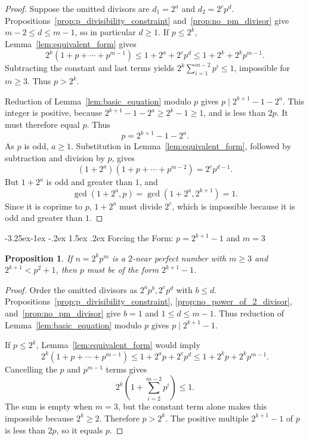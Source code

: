 \documentclass[10pt]{article}
\makeatletter
\renewcommand\subsection{\@startsection{subsection}{2}{\z@}
{-3.25ex\@plus -1ex \@minus -.2ex}
{1.5ex \@plus .2ex}
{\normalfont\normalsize\bfseries\boldmath}}
\newtheorem{proposition}{Proposition}
\theoremstyle{definition}
\makeatother
\begin{document}
\begin{proof}
Suppose the omitted divisors are $d_1=2^a$ and $d_2=2^cp^d$.
Propositions~\ref{prop:p_divisibility_constraint} and~\ref{prop:no_pm_divisor}
give $m-2\le d\le m-1$, so in particular $d\ge1$.
If $p\le2^k$, Lemma~\ref{lem:equivalent_form} gives
\[
2^k(1+p+\cdots+p^{m-1})
\le1+2^a+2^cp^d\le1+2^k+2^kp^{m-1}.
\]
Subtracting the constant and last terms yields
$2^k\sum_{i=1}^{m-2}p^i\le1$, impossible for $m\ge3$.
Thus $p>2^k$.

Reduction of Lemma~\ref{lem:basic_equation} modulo $p$ gives
$p\mid2^{k+1}-1-2^a$. This integer is positive, because
$2^{k+1}-1-2^a\ge2^k-1\ge1$, and is less than $2p$.
It must therefore equal $p$. Thus
\[
p=2^{k+1}-1-2^a.
\]
As $p$ is odd, $a\ge1$. Substitution in
Lemma~\ref{lem:equivalent_form}, followed by subtraction and division
by $p$, gives
\[
(1+2^a)(1+p+\cdots+p^{m-2})=2^cp^{d-1}.
\]
But $1+2^a$ is odd and greater than $1$, and
\[
\gcd(1+2^a,p)=\gcd(1+2^a,2^{k+1})=1.
\]
Since it is coprime to $p$, $1+2^a$ must divide $2^c$, which is
impossible because it is odd and greater than $1$.
\end{proof}

\subsection{Forcing the Form: $p = 2^{k+1} - 1$ and $m = 3$}
\label{sec:force-p-and-m}

\begin{proposition}\label{prop:p_is_mersenne_form}
    If $n=2^kp^m$ is a $2$-near perfect number with $m \ge 3$ and $2^{k+1} < p^2+1$, then $p$ must be of the form $2^{k+1}-1$.
\end{proposition}

\begin{proof}
Order the omitted divisors as $2^ap^b,2^cp^d$ with $b\le d$.
Propositions~\ref{prop:p_divisibility_constraint},
\ref{prop:no_power_of_2_divisor}, and~\ref{prop:no_pm_divisor}
give $b=1$ and $1\le d\le m-1$.
Thus reduction of Lemma~\ref{lem:basic_equation} modulo $p$ gives
$p\mid2^{k+1}-1$.

If $p\le2^k$, Lemma~\ref{lem:equivalent_form} would imply
\[
2^k(1+p+\cdots+p^{m-1})
\le1+2^ap+2^cp^d\le1+2^kp+2^kp^{m-1}.
\]
Cancelling the $p$ and $p^{m-1}$ terms gives
\[
2^k\left(1+\sum_{i=2}^{m-2}p^i\right)\le1.
\]
The sum is empty when $m=3$, but the constant term alone makes
this impossible because $2^k\ge2$. Therefore $p>2^k$.
The positive multiple $2^{k+1}-1$ of $p$ is less than $2p$,
so it equals $p$.
\end{proof}
\end{document}
